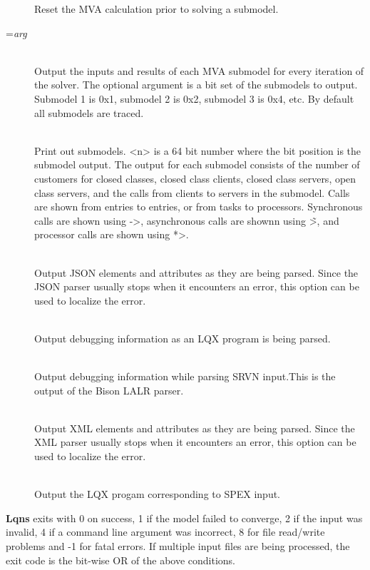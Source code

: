 \begin{description}
Reset the MVA calculation prior to solving a submodel.
\item[\longopt{trace-mva}=\emph{arg}]~\\
Output the inputs and results of each MVA submodel for every iteration of the solver.
The optional argument is a bit set of the submodels to output.  Submodel 1 is 0x1, 
submodel 2 is 0x2, submodel 3 is 0x4, etc.  By default all submodels are traced.
\item[\longopt{debug-submodels}]~\\
Print out submodels. <n> is a 64 bit number where the bit position is the submodel output.
The output for each submodel consists of the number of customers for closed classes, closed class clients, 
closed class servers, open class servers, and the calls from clients to servers in the submodel.
Calls are shown from entries to entries, or from tasks to processors.
Synchronous calls are shown using ->, 
asynchronous calls are shownn using \~>, and 
processor calls are shown using *>.
\item[\longopt{debug-json}]~\\
Output JSON elements and attributes as they are being parsed.   Since the JSON parser usually stops when it encounters an error,
this option can be used to localize the error.
\item[\longopt{debug-lqx}]~\\
Output debugging information as an LQX program is being parsed.
\item[\longopt{debug-srvn}]~\\
Output debugging information while parsing SRVN input.This is the output of the Bison LALR parser.
\item[\longopt{debug-xml}]~\\
Output XML elements and attributes as they are being parsed.
Since the XML parser usually stops when it encounters an error,
this option can be used to localize the error.
\item[\longopt{print-lqx}]~\\
Output the LQX progam corresponding to SPEX input.
\end{description}


\textbf{Lqns} exits with 0 on success, 1 if the model failed to converge,
2 if the input was invalid, 4 if a command line argument was
incorrect, 8 for file read/write problems and -1 for fatal errors.  If
multiple input files are being processed, the exit code is the
bit-wise OR of the above conditions.
